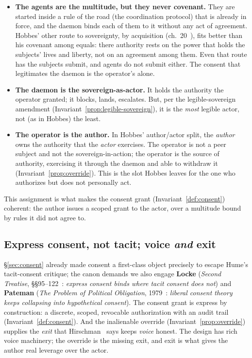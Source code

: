 \documentclass[11pt,a4paper]{article}
\theoremstyle{definition}
\theoremstyle{plain}
\newcounter{protocol}[section]
\begin{document}
\begin{itemize}[leftmargin=1.2em]
\item \textbf{The agents are the multitude, but they never covenant.} They are
started inside a rule of the road (the coordination protocol) that is already in
force, and the daemon binds each of them to it without any act of agreement.
Hobbes' other route to sovereignty, by acquisition (ch.~20~),
fits better than his covenant among equals: there authority rests on the power
that holds the subjects' lives and liberty, not on an agreement among them. Even
that route has the subjects submit, and agents do not submit either. The consent
that legitimates the daemon is the operator's alone.
\item \textbf{The daemon is the sovereign-as-actor.} It holds the authority the
operator granted; it blocks, lands, escalates. But, per the legible-sovereign
amendment (Invariant~\ref{prop:legible-sovereign}), it is the \emph{most} legible actor,
not (as in Hobbes) the least.
\item \textbf{The operator is the author.} In Hobbes' author/actor split, the
\emph{author} owns the authority that the \emph{actor} exercises. The operator is not
a peer subject and not the sovereign-in-action; the operator is the source of
authority, exercising it through the daemon and able to withdraw it
(Invariant~\ref{prop:override}). This is the slot Hobbes leaves for the one who authorizes
but does not personally act.
\end{itemize}

This assignment is what makes the consent grant (Invariant~\ref{def:consent}) coherent:
the author issues a scoped grant to the actor, over a multitude bound by rules it did not agree to.



\subsection{Express consent, not tacit; voice \emph{and} exit}\label{sec:express}

\S\ref{sec:consent} already made consent a first-class object precisely to escape
Hume's tacit-consent critique; the canon demands we also engage \textbf{Locke}
(\emph{Second Treatise}, \S\S95--122~: \emph{express consent binds
where tacit consent does not}) and \textbf{Pateman} (\emph{The Problem of Political
Obligation}, 1979~: \emph{liberal consent theory keeps collapsing
into hypothetical consent}). The consent grant is express by construction: a discrete,
scoped, revocable authorization with an audit trail (Invariant~\ref{def:consent}). And the
inalienable override (Invariant~\ref{prop:override}) supplies the \emph{exit} that
Hirschman~ says keeps \emph{voice} honest. The design has rich
voice machinery; the override is the missing exit, and exit is what gives the author
real leverage over the actor.
\end{document}
